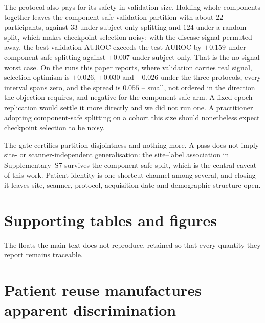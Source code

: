 \documentclass[11pt]{article}
\begin{document}
\begin{itemize}
          The protocol also pays for its safety in validation size.
          Holding whole components together leaves the component-safe
          validation partition with about $22$ participants, against
          $33$ under subject-only splitting and $124$ under a random
          split, which makes checkpoint selection noisy: with the
          disease signal permuted away, the best validation AUROC
          exceeds the test AUROC by $+0.159$ under component-safe
          splitting against $+0.007$ under subject-only. That is the
          no-signal worst case. On the runs this paper reports, where
          validation carries real signal, selection optimism is
          $+0.026$, $+0.030$ and $-0.026$ under the three protocols,
          every interval spans zero, and the spread is $0.055$ -- small,
          not ordered in the direction the objection requires, and
          negative for the component-safe arm. A fixed-epoch replication
          would settle it more directly and we did not run one. A
          practitioner adopting component-safe splitting on a cohort
          this size should nonetheless expect checkpoint selection to be
          noisy.

          The gate certifies partition disjointness and nothing more. A
          pass does not imply site- or scanner-independent
          generalisation: the site--label association in
          Supplementary~S7 survives the component-safe split, which is
          the central caveat of this work. Patient identity is one
          shortcut channel among several, and closing it leaves site,
          scanner, protocol, acquisition date and demographic structure
          open.\end{itemize}





\section{Supporting tables and figures}
\label{sm:supporting}
The floats the main text does not reproduce, retained so that every
quantity they report remains traceable.

\section{Patient reuse manufactures apparent discrimination}
\label{sm:sec:permutation_null}
\end{document}
